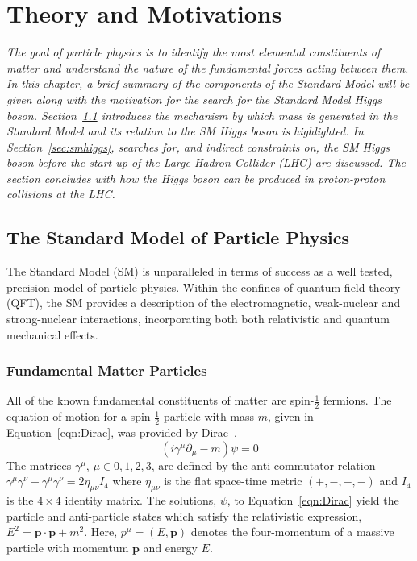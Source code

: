 \chapter{Theory and Motivations}
\label{chap:theory}

\emph{The goal of particle physics is to identify 
the most elemental constituents of matter and understand the nature of
the fundamental forces acting between them. In this chapter, a brief summary of 
the components of the Standard Model  will be given along with the motivation for
the search for the Standard Model Higgs boson. 
Section~\ref{sec:sm} introduces the mechanism by which mass is generated in the 
Standard Model and its relation to the SM Higgs boson is highlighted.
In Section~\ref{sec:smhiggs}, 
searches for, and indirect constraints on, the SM Higgs boson before the start up of 
the Large Hadron Collider (LHC) are discussed. The section concludes with 
how the Higgs boson can be produced in proton-proton collisions at the LHC.}

\section{The Standard Model of Particle Physics}
\label{sec:sm}

The Standard Model (SM) is unparalleled in terms of success as 
a well tested, precision model of particle physics. 
Within the confines of quantum field theory (QFT),  
the SM provides a description of the electromagnetic, weak-nuclear
and strong-nuclear interactions, incorporating both 
both relativistic and quantum mechanical effects.

\subsection{Fundamental Matter Particles}
All of the known fundamental constituents of matter
are spin-$\frac{1}{2}$ fermions. 
The equation of motion for a spin-$\frac{1}{2}$ particle with mass $m$, 
given in Equation~\ref{eqn:Dirac}, was provided by Dirac~\cite{null}.
\begin{equation}
(i\gamma^{\mu}\partial_{\mu} - m)\psi = 0
\label{eqn:Dirac}
\end{equation}
The matrices $\gamma^{\mu}$, $\mu\in{0,1,2,3}$,  are
defined by the anti commutator relation 
$\gamma^{\mu}\gamma^{\nu}+\gamma^{\mu}\gamma^{\nu} = 2\eta_{\mu\nu}I_{4}$ where
$\eta_{\mu\nu}$ is the flat space-time metric $(+,-,-,-)$ and $I_{4}$ is the $4\times4$
identity matrix.
The solutions, $\psi$, to Equation~\ref{eqn:Dirac} yield the particle and anti-particle
states which satisfy the relativistic expression, 
$E^{2} = \mathbf{p}\cdot\mathbf{p} + m^{2}$. Here, $p^{\mu} = (E,\mathbf{p})$ 
denotes the four-momentum of a massive particle with momentum $\mathbf{p}$ and energy $E$.
 
